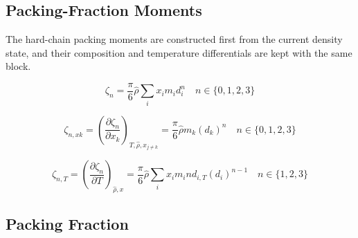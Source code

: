 \documentclass[12pt, letterpaper]{article}
\begin{document}
\subsection{Packing-Fraction Moments}

The hard-chain packing moments are constructed first from the current density state, and their composition and temperature differentials are kept with the same block.

\begin{equation}
    \zeta_{n}=\frac{\pi}{6} \hat{\rho} \sum_{i} x_{i} m_{i} d_{i}^n \quad n \in\{0,1,2,3\}
    \label{eq:zeta_n}
\end{equation}


\begin{equation}
    \zeta_{n,xk}=\left(\frac{\partial\zeta_{n}}{\partial x_{k}}\right)_{T,\hat{\rho},x_{j\neq k}}=\frac{\pi}{6}\hat{\rho} m_{k}(d_{k})^{n}\quad n\in\{0,1,2,3\}
    \label{eq:zeta_n_xk}
\end{equation}


\begin{equation}
    \zeta_{n,T}=\left(\frac{\partial\zeta_{n}}{\partial T}\right)_{\hat{\rho},x}=\frac{\pi}{6}\hat{\rho}\sum_{i}x_{i}m_{i}nd_{i,T}\left(d_{i}\right)^{n-1}\quad n\in\{1,2,3\}
    \label{eq:zeta_n_dT}
\end{equation}

\subsection{Packing Fraction}
\end{document}
